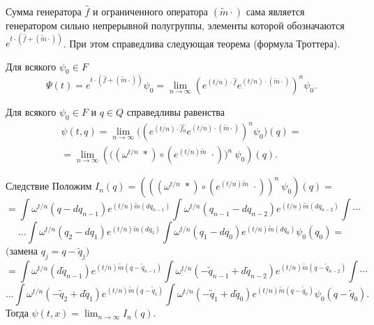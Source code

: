  \smallskip
 

Сумма генератора   $\hat f$  и ограниченного оператора $ (\widetilde{m
}\cdot) $  сама является генератором сильно непрерывной полугруппы,
 элементы которой обозначаются $ e^{t\cdot(\hat f+ (\widetilde{m }\cdot) )}$.
 При этом справедлива  следующая теорема (формула Троттера).

\smallskip
 \begin{theorem}[4]
  Для всякого $\psi_0\in F$ 
 $$
 \Psi(t)= e^{t\cdot\left(\widehat{ f }+ (\widetilde{m }\cdot) \right)}\psi_0
 =\lim_{n\to\infty}(e^{(t/n)\cdot \widehat{ f } }
 e^{(t/n)\cdot(\widetilde{m }\cdot) })^n\psi_0.
 $$
 \end{theorem}
\smallskip

\begin{lemma}[1]
 Для всякого $\psi_0\in F$ и $ q\in Q $
 справедливы равенства
\begin{multline*}
 \psi(t,q)=
  \lim_{n\to\infty}
  \bigl((e^{(t/n)\cdot \widehat{ f_0} }
  e^{(t/n)\cdot(\widetilde{m }\cdot) })^n
  \psi_0\bigr)(q)
 =
\\
 =\lim_{n\to\infty}
   \left(
   \bigl((\omega ^{t/n }\;*)\circ
 (e^{(t/n)\widetilde{m }}\;\cdot) \bigr)^n
 \ \psi_0\right)
 (q).
\end{multline*}
  \end{lemma}


\begin{newthm}{Следствие}
  Положим
 $I_n(q)=
    \left(
   ((\omega ^{t/n }\;*)\circ
 (e^{(t/n)\widetilde{m }}\;\cdot) )^n
 \ \psi_0\right)
 (q)
=$
%
%
 $$
  =
 \int \omega ^{t/n }(q-dq_{n-1}) e^{(t/n)\widetilde{m }(dq_{n-1})}
 \int \omega ^{t/n }(q_{n-1}-dq_{n-2}) e^{(t/n)\widetilde{m }(dq_{n-2})}
 \int
 \cdots
 $$
 $$
 \dots
 \int \omega ^{t/n }(q_{2}-dq_{1}) e^{(t/n)\widetilde{m }(dq_{1})}
 \int \omega ^{t/n }(q_{1}-dq_{0}) e^{(t/n)\widetilde{m }(dq_{0})}
  \psi_0(q_0)
  =
  $$
 $($замена $q_j=q-\widetilde q_j)$
 $$
  =
 \int \omega ^{t/n }(d\widetilde q_{n-1}) e^{(t/n)\widetilde{m }(q-\widetilde q_{n-1})}
 \int \omega ^{t/n }(-\widetilde q_{n-1}+d\widetilde q_{n-2}) e^{(t/n)\widetilde{m }(q-\widetilde q_{n-2})}
 \int
 \cdots
 $$
 $$
 \dots
 \int \omega ^{t/n }(-\widetilde q_{2}+d\widetilde q_{1}) e^{(t/n)\widetilde{m }(q-\widetilde q_{1})}
 \int \omega ^{t/n }(-\widetilde q_{1}+d\widetilde q_{0}) e^{(t/n)\widetilde{m }(q-\widetilde q_{0})}
  \psi_0(q-\widetilde q_0).
  $$
  Тогда
  $
  \psi(t,x)
  =
  \lim_{n\to\infty}
  I_n(q).
  $
 \end{newthm}

